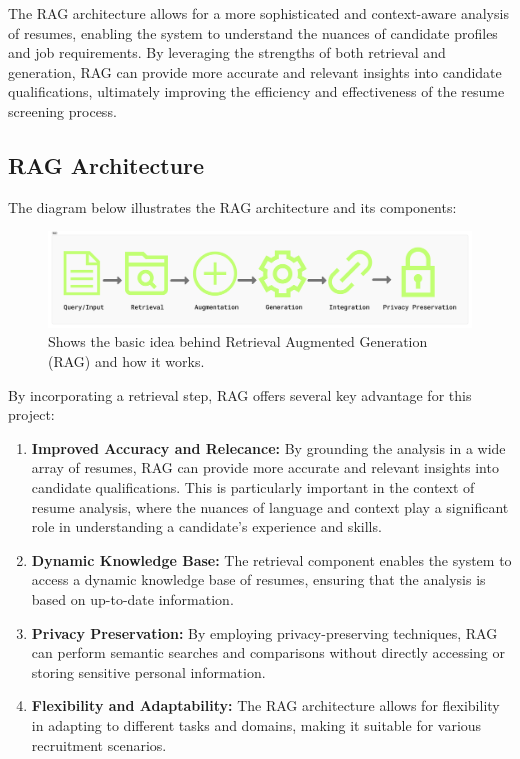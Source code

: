 \documentclass[12pt]{report}
\begin{document}
The RAG architecture allows for a more sophisticated and context-aware analysis of resumes, enabling the system to understand the nuances of candidate profiles and job requirements. By leveraging the strengths of both retrieval and generation, RAG can provide more accurate and relevant insights into candidate qualifications, ultimately improving the efficiency and effectiveness of the resume screening process.

\subsection{RAG Architecture}
The diagram below illustrates the RAG architecture and its components:
\begin{figure}[h]
    \centering
    \includegraphics[width=1\textwidth]{images/RAG_Diagrams.png}
    \caption{Shows the basic idea behind Retrieval Augmented Generation (RAG) and how it works.}
    \label{fig:rag_diagram}
\end{figure}

By incorporating a retrieval step, RAG offers several key advantage for this project: 
\begin{enumerate}
    \item \textbf{Improved Accuracy and Relecance:} By grounding the analysis in a wide array of resumes, RAG can provide more accurate and relevant insights into candidate qualifications. This is particularly important in the context of resume analysis, where the nuances of language and context play a significant role in understanding a candidate's experience and skills.
    \item \textbf{Dynamic Knowledge Base:} The retrieval component enables the system to access a dynamic knowledge base of resumes, ensuring that the analysis is based on up-to-date information.
    \item \textbf{Privacy Preservation:} By employing privacy-preserving techniques, RAG can perform semantic searches and comparisons without directly accessing or storing sensitive personal information.
    \item \textbf{Flexibility and Adaptability:} The RAG architecture allows for flexibility in adapting to different tasks and domains, making it suitable for various recruitment scenarios.
\end{enumerate}
\end{document}
